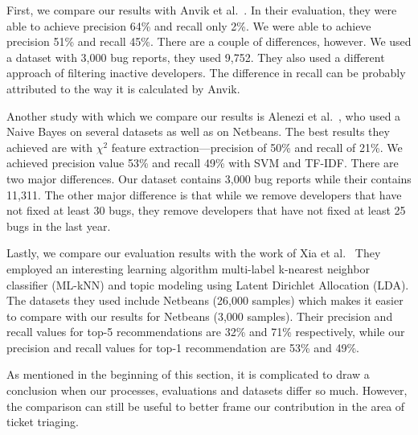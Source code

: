 First, we compare our results with Anvik et al.~\cite{Anvik2006}. In their evaluation, they were able to achieve precision 64\% and recall only 2\%. We were able to achieve precision 51\% and recall 45\%. There are a couple of differences, however. We used a dataset with 3,000 bug reports, they used 9,752. They also used a different approach of filtering inactive developers. The difference in recall can be probably attributed to the way it is calculated by Anvik.

Another study with which we compare our results is Alenezi et al.~\cite{Alenezi2013}, who used a Naive Bayes on several datasets as well as on Netbeans. The best results they achieved are with $\chi^2$ feature extraction---precision of 50\% and recall of 21\%. We achieved precision value 53\% and recall 49\% with SVM and TF-IDF. There are two major differences. Our dataset contains 3,000 bug reports while their contains 11,311. The other major difference is that while we remove developers that have not fixed at least 30 bugs, they remove developers that have not fixed at least 25 bugs in the last year.

Lastly, we compare our evaluation results with the work of Xia et al.~\cite{Xia2015} They employed an interesting learning algorithm multi-label k-nearest neighbor classifier (ML-kNN) and topic modeling using Latent Dirichlet Allocation (LDA). The datasets they used include Netbeans (26,000 samples) which makes it easier to compare with our results for Netbeans (3,000 samples). Their precision and recall values for top-5 recommendations are 32\% and 71\% respectively, while our precision and recall values for top-1 recommendation are 53\% and 49\%.

As mentioned in the beginning of this section, it is complicated to draw a conclusion when our processes, evaluations and datasets differ so much. However, the comparison can still be useful to better frame our contribution in the area of ticket triaging.